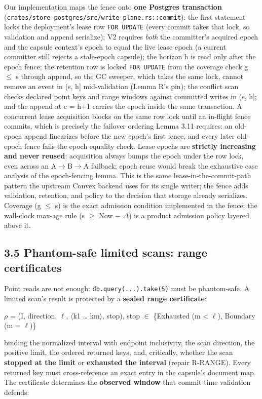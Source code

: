 \documentclass[
  11pt,
]{article}
\begin{document}
Our implementation maps the fence onto \textbf{one Postgres transaction} (\texttt{crates/store-postgres/src/write\_plane.rs::commit}): the first statement locks the deployment's lease row \texttt{FOR\ UPDATE} (every commit takes that lock, so validation and append serialize); V2 requires \emph{both} the committer's acquired epoch and the capsule context's epoch to equal the live lease epoch (a current committer still rejects a stale-epoch capsule); the horizon h is read only after the epoch fence; the retention row is locked \texttt{FOR\ UPDATE} from the coverage check g $\le$ s through append, so the GC sweeper, which takes the same lock, cannot remove an event in (s, h{]} mid-validation (Lemma R's pin); the conflict scan checks declared point keys and range windows against committed writes in (s, h{]}; and the append at c = h+1 carries the epoch inside the same transaction. A concurrent lease acquisition blocks on the same row lock until an in-flight fence commits, which is precisely the failover ordering Lemma 3.11 requires: an old-epoch append linearizes before the new epoch's first fence, and every later old-epoch fence fails the epoch equality check. Lease epochs are \textbf{strictly increasing and never reused}: acquisition always bumps the epoch under the row lock, even across an A$\rightarrow$B$\rightarrow$A failback; epoch reuse would break the exhaustive case analysis of the epoch-fencing lemma. This is the same lease-in-the-commit-path pattern the upstream Convex backend uses for its single writer; the fence adds validation, retention, and policy to the decision that storage already serializes. Coverage (g $\le$ s) is the exact admission condition implemented in the fence; the wall-clock max-age rule (s $\ge$ Now $-$ $\Delta$) is a product admission policy layered above it.

\subsection{3.5 Phantom-safe limited scans: range certificates}\label{phantom-safe-limited-scans-range-certificates}

Point reads are not enough: \texttt{db.query(...).take(5)} must be phantom-safe. A limited scan's result is protected by a \textbf{sealed range certificate}:

$\rho$ = (I, direction, $\ell$, $\langle$k1 \ldots{} km$\rangle$, stop), stop $\in$ \{Exhausted (m \textless{} $\ell$), Boundary (m = $\ell$)\}

binding the normalized interval with endpoint inclusivity, the scan direction, the positive limit, the ordered returned keys, and, critically, whether the scan \textbf{stopped at the limit} or \textbf{exhausted the interval} (repair R-RANGE). Every returned key must cross-reference an exact entry in the capsule's document map. The certificate determines the \textbf{observed window} that commit-time validation defends:
\end{document}
